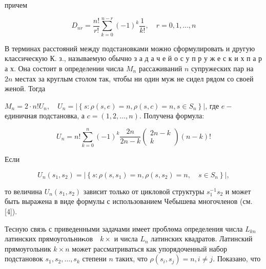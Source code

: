 \documentclass[10pt]{article}
\begin{document}
причем



\[

D_{n r}=\frac{n !}{r !} \sum_{k=0}^{n-r}(-1)^{k} \frac{1}{k !}, \quad r=0,1, \ldots, n

\]



В терминах расстояний между подстановками можно сформулировать и другую классическую К. з., называемую обычно з а д а ч е й о с у п р у ж е с к и х п а р а х. Она состоит в определении числа $M_{n}$ рассаживаний $n$ супружеских пар на $2 n$ местах за круглым столом так, чтобы ни один муж не сидел рядом со своей женой. Тогда



$M_{n}=2 \cdot n ! U_{n}, \quad U_{n}=\left|\left\{s: \rho(s, e)=n, \rho(s, c)=n, s \in S_{n}\right\}\right|$, где $e-$ единичная подстановка, а $c=(1,2, \ldots, n)$. Получена формула:



\[

U_{n}=n ! \sum_{k=0}^{n}(-1)^{k} \frac{2 n}{2 n-k}\left(\begin{array}{c}

2 n-k \\

k

\end{array}\right)(n-k) !

\]



Если



\[

U_{n}\left(s_{1}, s_{2}\right)=\left|\left\{s: \rho\left(s, s_{1}\right)=n, \rho\left(s, s_{2}\right)=n, \quad s \in S_{n}\right\}\right|,

\]



то величина $U_{n}\left(s_{1}, s_{2}\right)$ зависит только от цикловой структуры $s_{1}^{-1} s_{2}$ и может быть выражена в виде формулы с использованием Чебышева многочленов (см. [4]).



Тесную связь с приведенными задачами имеет проблөма определения числа $L_{k n}$ латинских прямоугольни$\boldsymbol{\kappa} о в \quad k \times$ и числа $L_{n}$ латинских квадратов. Латинский прямоугольник $k \times n$ может рассматриваться как упорядоченный набор подстановок $s_{1}, s_{2}, \ldots, s_{k}$ степени $n$ таких, что $\rho\left(s_{i}, s_{j}\right)=n, i \neq j$. Показано, что
\end{document}
